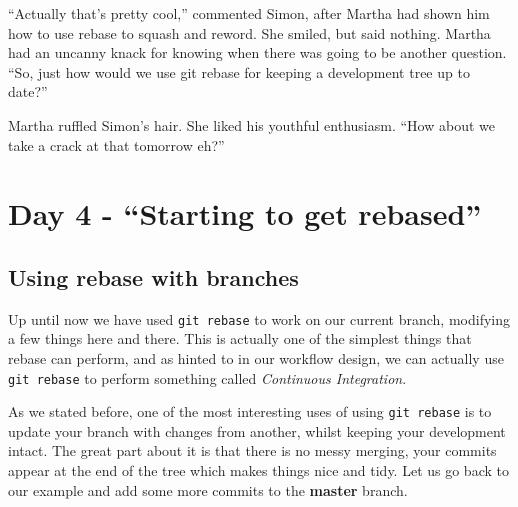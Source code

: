 \begin{trenches}
``Actually that's pretty cool,'' commented Simon, after Martha had shown him how to use rebase to squash and reword.
She smiled, but said nothing.
Martha had an uncanny knack for knowing when there was going to be another question.
``So, just how would we use git rebase for keeping a development tree up to date?''

Martha ruffled Simon's hair.
She liked his youthful enthusiasm.
``How about we take a crack at that tomorrow eh?''
\end{trenches}

\section{Day 4 - ``Starting to get rebased''}
\subsection{Using rebase with branches}
Up until now we have used \texttt{git rebase} to work on our current branch, modifying a few things here and there.
This is actually one of the simplest things that rebase can perform, and as hinted to in our workflow design, we can actually use \texttt{git rebase} to perform something called \emph{Continuous Integration}.

As we stated before, one of the most interesting uses of using \texttt{git rebase} is to update your branch with changes from another, whilst keeping your development intact.
The great part about it is that there is no messy merging, your commits appear at the end of the tree which makes things nice and tidy.
Let us go back to our example and add some more commits to the \textbf{master} branch.


